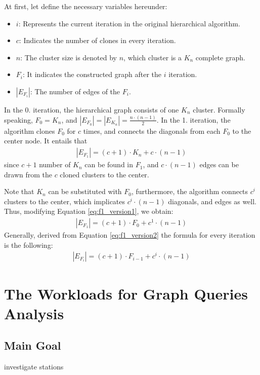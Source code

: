 At first, let define the necessary variables hereunder:
\begin{itemize}
	\item{$i$}: Represents the current iteration in the original hierarchical algorithm.
	\item{$c$}: Indicates the number of clones in every iteration.
	\item{$n$}: The cluster size is denoted by $n$, which cluster is a $K_n$ complete graph.
	\item{$F_i$}: It indicates the constructed graph after the $i$ iteration.
	\item{$|E_{F_i}|$}: The number of edges of the $F_i$.
\end{itemize}

In the 0. iteration, the hierarchical graph consists of one $K_n$ cluster. Formally speaking, $F_0 = K_n$, and $|E_{F_0}| = |E_{K_n}| = \frac{n \cdot (n-1)}{2}$. In the 1. iteration, the algorithm clones $F_0$ for $c$ times, and connects the diagonals from each $F_0$ to the center node. It entails that 
\begin{align}\label{eq:f1_version1}
	|E_{F_1}| = (c+1) \cdot K_n + c \cdot (n - 1)	
\end{align}
since $c+1$ number of $K_n$ can be found in $F_1$, and $c \cdot (n - 1)$ edges can be drawn from the $c$ cloned clusters to the center.

Note that $K_n$ can be substituted with $F_0$, furthermore, the algorithm connects $c^i$ clusters to the center, which implicates $c^i \cdot (n-1)$ diagonals, and edges as well. Thus, modifying Equation \ref{eq:f1_version1}, we obtain:
\begin{align}\label{eq:f1_version2}
	|E_{F_1}| = (c+1) \cdot F_0 + c^1 \cdot (n - 1)	
\end{align}
Generally, derived from Equation \ref{eq:f1_version2} the formula for every iteration is the following:
\begin{align}
	|E_{F_i}| = (c+1) \cdot F_{i-1} + c^i \cdot (n - 1)	
\end{align}


\section{The Workloads for Graph Queries Analysis}

\subsection{Main Goal}
investigate stations
